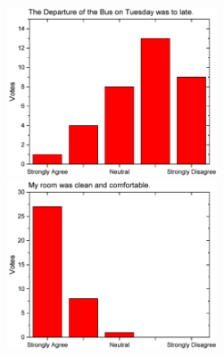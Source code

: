 \begin{figure}[h!]
\begin{minipage}{.48\linewidth}
      {\includegraphics[height=50mm]{figures/n/Graph5.pdf}}
      {\includegraphics[height=50mm]{figures/n/Graph6.pdf}}
  \end{minipage}
\end{figure}

